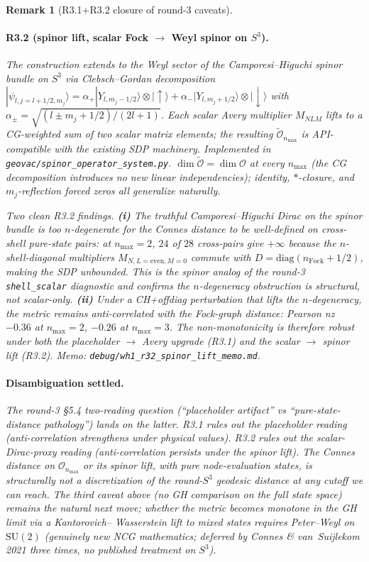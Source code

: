 \documentclass[11pt]{article}
\newtheorem{remark}{Remark}
\begin{document}
\begin{remark}[R3.1+R3.2 closure of round-3 caveats]
\paragraph{R3.2 (spinor lift, scalar Fock $\to$ Weyl spinor on
$S^3$).}  The construction extends to the Weyl sector of the
Camporesi--Higuchi spinor bundle on $S^3$ via Clebsch--Gordan
decomposition $|\psi_{l, j = l + 1/2, m_j}\rangle = \alpha_+
|Y_{l, m_j - 1/2}\rangle \otimes |\!\!\uparrow\rangle + \alpha_-
|Y_{l, m_j + 1/2}\rangle \otimes |\!\!\downarrow\rangle$ with
$\alpha_\pm = \sqrt{(l \pm m_j + 1/2)/(2l + 1)}$.  Each scalar
Avery multiplier $M_{NLM}$ lifts to a CG-weighted sum of two
scalar matrix elements; the resulting
$\widetilde{\mathcal{O}}_{n_{\max}}$ is API-compatible with the
existing SDP machinery.  Implemented in
\texttt{geovac/spinor\_operator\_system.py}.  $\dim
\widetilde{\mathcal{O}} = \dim \mathcal{O}$ at every $n_{\max}$
(the CG decomposition introduces no new linear independencies);
identity, $\ast$-closure, and $m_j$-reflection forced zeros all
generalize naturally.

Two clean R3.2 findings.  \textbf{(i)} \emph{The truthful
Camporesi--Higuchi Dirac on the spinor bundle is too
$n$-degenerate} for the Connes distance to be well-defined on
cross-shell pure-state pairs: at $n_{\max} = 2$, $24$ of $28$
cross-pairs give $+\infty$ because the $n$-shell-diagonal
multipliers $M_{N, L = \mathrm{even}, M = 0}$ commute with $D =
\mathrm{diag}(n_{\mathrm{Fock}} + 1/2)$, making the SDP
unbounded.  This is the spinor analog of the round-3
\texttt{shell\_scalar} diagnostic and confirms the
$n$-degeneracy obstruction is structural, not scalar-only.
\textbf{(ii)} \emph{Under a CH+offdiag perturbation that lifts
the $n$-degeneracy, the metric remains anti-correlated} with the
Fock-graph distance: Pearson nz $-0.36$ at $n_{\max} = 2$,
$-0.26$ at $n_{\max} = 3$.  The non-monotonicity is therefore
robust under both the placeholder $\to$ Avery upgrade (R3.1)
\emph{and} the scalar $\to$ spinor lift (R3.2).  Memo:
\texttt{debug/wh1\_r32\_spinor\_lift\_memo.md}.

\paragraph{Disambiguation settled.}  The round-3 \S 5.4
two-reading question (``placeholder artifact'' vs
``pure-state-distance pathology'') lands on the latter.  R3.1
rules out the placeholder reading (anti-correlation
\emph{strengthens} under physical values).  R3.2 rules out the
scalar-Dirac-proxy reading (anti-correlation persists under the
spinor lift).  The Connes distance on $\mathcal{O}_{n_{\max}}$ or
its spinor lift, with pure node-evaluation states, is structurally
not a discretization of the round-$S^3$ geodesic distance at any
cutoff we can reach.  The third caveat above (no GH comparison
on the full state space) remains the natural next move; whether
the metric becomes monotone in the GH limit via a Kantorovich--
Wasserstein lift to mixed states requires Peter--Weyl on
$\mathrm{SU}(2)$ (genuinely new NCG mathematics; deferred by
Connes \& van~Suijlekom 2021 three times, no published treatment
on $S^3$).
\end{remark}
\end{document}
